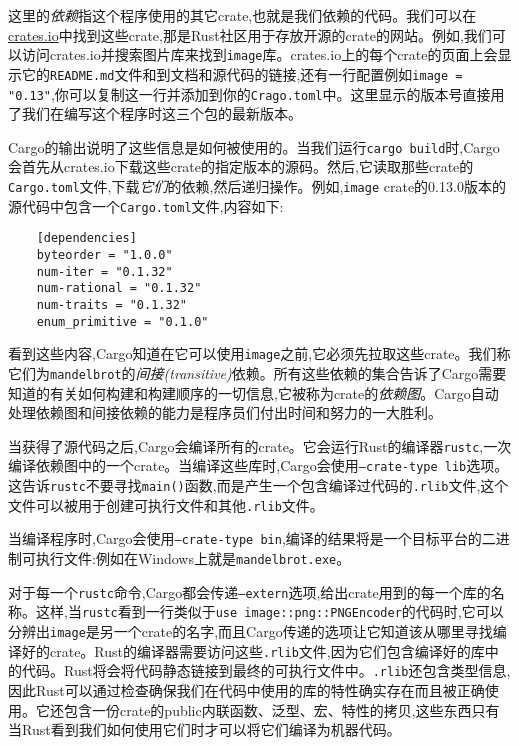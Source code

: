 这里的\emph{依赖}指这个程序使用的其它crate,也就是我们依赖的代码。我们可以在\href{https://crates.io}{crates.io}中找到这些crate,那是Rust社区用于存放开源的crate的网站。例如,我们可以访问crates.io并搜索图片库来找到\texttt{image}库。crates.io上的每个crate的页面上会显示它的\texttt{README.md}文件和到文档和源代码的链接,还有一行配置例如\texttt{image = "0.13"},你可以复制这一行并添加到你的\texttt{Crago.toml}中。这里显示的版本号直接用了我们在编写这个程序时这三个包的最新版本。

Cargo的输出说明了这些信息是如何被使用的。当我们运行\texttt{cargo build}时,Cargo会首先从crates.io下载这些crate的指定版本的源码。然后,它读取那些crate的\texttt{Cargo.toml}文件,下载\emph{它们}的依赖,然后递归操作。例如,\texttt{image} crate的0.13.0版本的源代码中包含一个\texttt{Cargo.toml}文件,内容如下:
\begin{verbatim}
    [dependencies]
    byteorder = "1.0.0"
    num-iter = "0.1.32"
    num-rational = "0.1.32"
    num-traits = "0.1.32"
    enum_primitive = "0.1.0"
\end{verbatim}

看到这些内容,Cargo知道在它可以使用\texttt{image}之前,它必须先拉取这些crate。我们称它们为\texttt{mandelbrot}的\emph{间接(transitive)}依赖。所有这些依赖的集合告诉了Cargo需要知道的有关如何构建和构建顺序的一切信息,它被称为crate的\emph{依赖图}。Cargo自动处理依赖图和间接依赖的能力是程序员们付出时间和努力的一大胜利。

当获得了源代码之后,Cargo会编译所有的crate。它会运行Rust的编译器\texttt{rustc},一次编译依赖图中的一个crate。当编译这些库时,Cargo会使用\texttt{--crate-type lib}选项。这告诉\texttt{rustc}不要寻找\texttt{main()}函数,而是产生一个包含编译过代码的\texttt{.rlib}文件,这个文件可以被用于创建可执行文件和其他\texttt{.rlib}文件。

当编译程序时,Cargo会使用\texttt{--crate-type bin},编译的结果将是一个目标平台的二进制可执行文件:例如在Windows上就是\texttt{mandelbrot.exe}。

对于每一个\texttt{rustc}命令,Cargo都会传递\texttt{--extern}选项,给出crate用到的每一个库的名称。这样,当\texttt{rustc}看到一行类似于\texttt{use image::png::PNGEncoder}的代码时,它可以分辨出\texttt{image}是另一个crate的名字,而且Cargo传递的选项让它知道该从哪里寻找编译好的crate。Rust的编译器需要访问这些\texttt{.rlib}文件,因为它们包含编译好的库中的代码。Rust将会将代码静态链接到最终的可执行文件中。\texttt{.rlib}还包含类型信息,因此Rust可以通过检查确保我们在代码中使用的库的特性确实存在而且被正确使用。它还包含一份crate的public内联函数、泛型、宏、特性的拷贝,这些东西只有当Rust看到我们如何使用它们时才可以将它们编译为机器代码。


